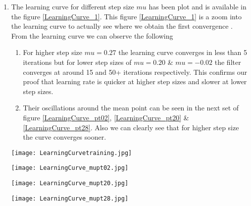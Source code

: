 \documentclass[conference]{IEEEtran}
\begin{document}
\begin{enumerate}
The figure \ref{WvsIterations} gives us the different values of W1 and W2 over iterations. \\

\begin{figure*}
\centering
\texttt{[image: WeightTrackFor2WeightCase.jpg]}
\caption{WeightTracks Over Iterations}
\label{WvsIterations}
\end{figure*}

\item The learning curve for different step size $mu$ has been plot and is available in the figure \ref{LearningCurve_1}. This figure \ref{LearningCurve_1} is a zoom into the learning curve to actually see where we obtain the first convergence . From the learning curve we can observe the following 
\begin{enumerate}

\item For higher step size $mu=0.27$ the learning curve converges in less than 5 iterations but for lower step sizes of $mu=0.20$ \& $mu=-0.02$ the filter converges at around 15 and 50+ iterations respectively. This confirms our proof that learning rate is quicker at higher step sizes and slower at lower step sizes. 

\item Their oscillations around the mean point can be seen in the next set of figure \ref{LearningCurve_pt02}, \ref{LearningCurve_pt20} \& \ref{LearningCurve_pt28}. Also we can clearly see that for higher step size the curve converges sooner. \\

\end{enumerate} 
\begin{figure*}
\centering
\texttt{[image: LearningCurvetraining.jpg]}
\caption{Learning Curve zoomed in for 50 iterations}
\label{LearningCurve_1}
\end{figure*}


\begin{figure*}
\centering
\texttt{[image: LearningCurve\_mupt02.jpg]}
\caption{LearningCurve for mu = 0.02}
\label{LearningCurve_pt02}
\end{figure*}

\begin{figure*}
\centering
\texttt{[image: LearningCurve\_mupt20.jpg]}
\caption{LearningCurvefor mu = 0.20}
\label{LearningCurve_pt20}
\end{figure*}

\begin{figure*}
\centering
\texttt{[image: LearningCurve\_mupt28.jpg]}
\caption{LearningCurve for mu = 0.28}
\label{LearningCurve_pt28}
\end{figure*}


\end{enumerate}
\end{document}
